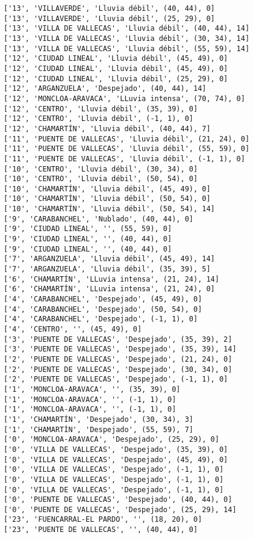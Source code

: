 \documentclass[11pt]{article}
\begin{document}
\begin{Verbatim}[commandchars=\\\{\}]
['13', 'VILLAVERDE', 'Lluvia débil', (40, 44), 0]
['13', 'VILLAVERDE', 'Lluvia débil', (25, 29), 0]
['13', 'VILLA DE VALLECAS', 'Lluvia débil', (40, 44), 14]
['13', 'VILLA DE VALLECAS', 'Lluvia débil', (30, 34), 14]
['13', 'VILLA DE VALLECAS', 'Lluvia débil', (55, 59), 14]
['12', 'CIUDAD LINEAL', 'Lluvia débil', (45, 49), 0]
['12', 'CIUDAD LINEAL', 'Lluvia débil', (45, 49), 0]
['12', 'CIUDAD LINEAL', 'Lluvia débil', (25, 29), 0]
['12', 'ARGANZUELA', 'Despejado', (40, 44), 14]
['12', 'MONCLOA-ARAVACA', 'LLuvia intensa', (70, 74), 0]
['12', 'CENTRO', 'Lluvia débil', (35, 39), 0]
['12', 'CENTRO', 'Lluvia débil', (-1, 1), 0]
['12', 'CHAMARTÍN', 'Lluvia débil', (40, 44), 7]
['11', 'PUENTE DE VALLECAS', 'Lluvia débil', (21, 24), 0]
['11', 'PUENTE DE VALLECAS', 'Lluvia débil', (55, 59), 0]
['11', 'PUENTE DE VALLECAS', 'Lluvia débil', (-1, 1), 0]
['10', 'CENTRO', 'Lluvia débil', (30, 34), 0]
['10', 'CENTRO', 'Lluvia débil', (50, 54), 0]
['10', 'CHAMARTÍN', 'Lluvia débil', (45, 49), 0]
['10', 'CHAMARTÍN', 'Lluvia débil', (50, 54), 0]
['10', 'CHAMARTÍN', 'Lluvia débil', (50, 54), 14]
['9', 'CARABANCHEL', 'Nublado', (40, 44), 0]
['9', 'CIUDAD LINEAL', '', (55, 59), 0]
['9', 'CIUDAD LINEAL', '', (40, 44), 0]
['9', 'CIUDAD LINEAL', '', (40, 44), 0]
['7', 'ARGANZUELA', 'Lluvia débil', (45, 49), 14]
['7', 'ARGANZUELA', 'Lluvia débil', (35, 39), 5]
['6', 'CHAMARTÍN', 'LLuvia intensa', (21, 24), 14]
['6', 'CHAMARTÍN', 'LLuvia intensa', (21, 24), 0]
['4', 'CARABANCHEL', 'Despejado', (45, 49), 0]
['4', 'CARABANCHEL', 'Despejado', (50, 54), 0]
['4', 'CARABANCHEL', 'Despejado', (-1, 1), 0]
['4', 'CENTRO', '', (45, 49), 0]
['3', 'PUENTE DE VALLECAS', 'Despejado', (35, 39), 2]
['3', 'PUENTE DE VALLECAS', 'Despejado', (35, 39), 14]
['2', 'PUENTE DE VALLECAS', 'Despejado', (21, 24), 0]
['2', 'PUENTE DE VALLECAS', 'Despejado', (30, 34), 0]
['2', 'PUENTE DE VALLECAS', 'Despejado', (-1, 1), 0]
['1', 'MONCLOA-ARAVACA', '', (35, 39), 0]
['1', 'MONCLOA-ARAVACA', '', (-1, 1), 0]
['1', 'MONCLOA-ARAVACA', '', (-1, 1), 0]
['1', 'CHAMARTÍN', 'Despejado', (30, 34), 3]
['1', 'CHAMARTÍN', 'Despejado', (55, 59), 7]
['0', 'MONCLOA-ARAVACA', 'Despejado', (25, 29), 0]
['0', 'VILLA DE VALLECAS', 'Despejado', (35, 39), 0]
['0', 'VILLA DE VALLECAS', 'Despejado', (45, 49), 0]
['0', 'VILLA DE VALLECAS', 'Despejado', (-1, 1), 0]
['0', 'VILLA DE VALLECAS', 'Despejado', (-1, 1), 0]
['0', 'VILLA DE VALLECAS', 'Despejado', (-1, 1), 0]
['0', 'PUENTE DE VALLECAS', 'Despejado', (40, 44), 0]
['0', 'PUENTE DE VALLECAS', 'Despejado', (25, 29), 14]
['23', 'FUENCARRAL-EL PARDO', '', (18, 20), 0]
['23', 'PUENTE DE VALLECAS', '', (40, 44), 0]

\end{Verbatim}
\end{document}
